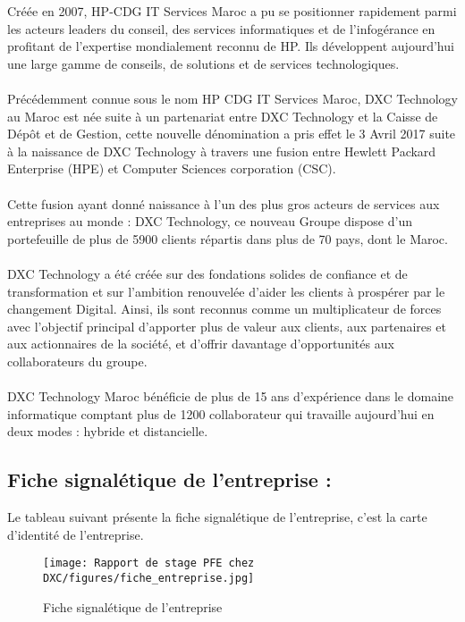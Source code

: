 Créée en 2007, HP-CDG IT Services Maroc a pu se positionner
rapidement parmi les acteurs leaders du conseil, des services informatiques et de
l’infogérance en profitant de l’expertise mondialement reconnu de HP. Ils développent
aujourd’hui une large gamme de conseils, de solutions et de services technologiques.
\\
\\
Précédemment connue sous le nom HP CDG IT Services Maroc, DXC Technology au Maroc est
née suite à un partenariat entre DXC Technology et la Caisse de Dépôt et de Gestion, cette nouvelle dénomination a pris effet le 3 Avril 2017 suite à la naissance de DXC Technology à travers une fusion entre Hewlett Packard Enterprise (HPE) et Computer Sciences corporation (CSC).
\\
\\
Cette fusion ayant donné naissance à l’un des plus gros acteurs de services aux entreprises au monde : DXC Technology, ce nouveau Groupe dispose d’un portefeuille de plus de 5900 clients répartis dans plus de 70 pays, dont le Maroc.
\\
\\
DXC Technology a été créée sur des fondations solides de confiance et de transformation et sur l’ambition renouvelée d’aider les clients à prospérer par le changement Digital. Ainsi, ils sont reconnus comme un multiplicateur de forces avec l’objectif principal d’apporter plus de valeur aux clients, aux partenaires et aux actionnaires de la société, et d’offrir davantage d’opportunités aux collaborateurs du groupe.
\\
\\
DXC Technology Maroc bénéficie de plus de 15 ans d’expérience dans le domaine informatique comptant plus de 1200 collaborateur qui travaille aujourd’hui en deux modes : hybride et distancielle.

\newpage
\subsection{Fiche signalétique de l’entreprise :}

Le tableau suivant présente la fiche signalétique de l’entreprise, c’est la carte d’identité de
l’entreprise.

\begin{figure}[h]
    \centering
    \texttt{[image: Rapport de stage PFE chez DXC/figures/fiche\_entreprise.jpg]}
    \caption{Fiche signalétique de l'entreprise}
\end{figure}

